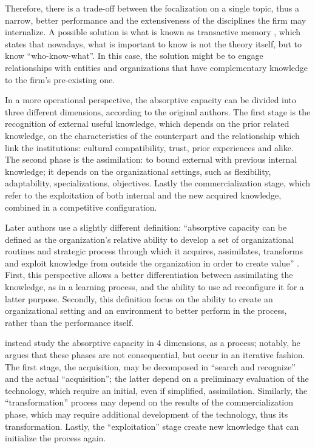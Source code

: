 Therefore, there is a trade-off between the focalization on a single topic, thus a narrow, better performance and the extensiveness of the disciplines the firm may internalize. A possible solution is what is known as transactive memory \citep{Wegner1987}, which states that nowadays, what is important to know is not the theory itself, but to know \enquote{who-know-what}. In this case, the solution might be to engage relationships with entities and organizations that have complementary knowledge to the firm's pre-existing one. 

In a more operational perspective, the absorptive capacity can be divided into three different dimensions, according to the original authors. The first stage is the recognition of external useful knowledge, which depends on the prior related knowledge, on the characteristics of the counterpart and the relationship which link the institutions: cultural compatibility, trust, prior experiences and alike. The second phase is the assimilation: to bound external with previous internal knowledge; it depends on the organizational settings, such as flexibility, adaptability, specializations, objectives. Lastly the commercialization stage, which refer to the exploitation of both internal and the new acquired knowledge, combined in a competitive configuration.

Later authors use a slightly different definition: \enquote{absorptive capacity can be defined as the organization's relative ability to develop a set of organizational routines and strategic process through which it acquires, assimilates, transforms and exploit knowledge from outside the organization in order to create value} \citep{Jimenez2011}. First, this perspective allows a better differentiation between assimilating the knowledge, as in a learning process, and the ability to use ad reconfigure it for a latter purpose. Secondly, this definition focus on the ability to create an organizational setting and an environment to better perform in the process, rather than the performance itself. 

\citet{Patterson2015} instead study the absorptive capacity in 4 dimensions, as a process; notably, he argues that these phases are not consequential, but occur in an iterative fashion. The first stage, the acquisition, may be decomposed in \enquote{search and recognize} and the actual \enquote{acquisition}; the latter depend on a preliminary evaluation of the technology, which require an initial, even if simplified, assimilation. Similarly, the \enquote{transformation} process may depend on the results of the commercialization phase, which may require additional development of the technology, thus its transformation. Lastly, the \enquote{exploitation} stage create new knowledge that can initialize the process again. 

